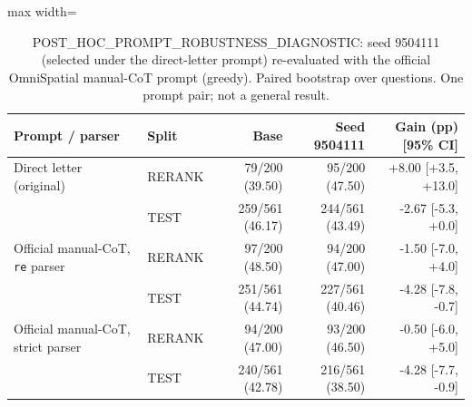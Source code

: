 \begin{table}[t]
\centering
\small
\begin{adjustbox}{max width=\linewidth}
\begin{tabular}{llrrr}
\toprule
Prompt / parser & Split & Base & Seed 9504111 & Gain (pp) [95\% CI] \\
\midrule
Direct letter (original) & RERANK & 79/200 (39.50) & 95/200 (47.50) & +8.00 [+3.5, +13.0] \\
 & TEST & 259/561 (46.17) & 244/561 (43.49) & -2.67 [-5.3, +0.0] \\
\midrule
Official manual-CoT, \texttt{re} parser & RERANK & 97/200 (48.50) & 94/200 (47.00) & -1.50 [-7.0, +4.0] \\
 & TEST & 251/561 (44.74) & 227/561 (40.46) & -4.28 [-7.8, -0.7] \\
\midrule
Official manual-CoT, strict parser & RERANK & 94/200 (47.00) & 93/200 (46.50) & -0.50 [-6.0, +5.0] \\
 & TEST & 240/561 (42.78) & 216/561 (38.50) & -4.28 [-7.7, -0.9] \\
\bottomrule
\end{tabular}
\end{adjustbox}
\caption{POST\_HOC\_PROMPT\_ROBUSTNESS\_DIAGNOSTIC: seed 9504111 (selected under the direct-letter prompt) re-evaluated with the official OmniSpatial manual-CoT prompt (greedy). Paired bootstrap over questions. One prompt pair; not a general result.}
\label{tab:prompt}
\end{table}
